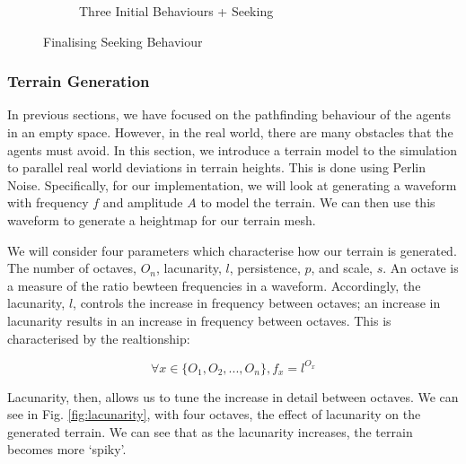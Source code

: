 \documentclass[12pt]{article}
\begin{document}
\begin{figure}[H]
\begin{subfigure}{.45\textwidth}
\caption{Three Initial Behaviours + Seeking}
\label{fig:exp7}
\end{subfigure}
\caption{Finalising Seeking Behaviour}
\label{fig:exp67}
\end{figure}

\subsubsection{Terrain Generation}
In previous sections, we have focused on the pathfinding behaviour of the agents in an empty space. However, in the real world, there are many obstacles that the agents must avoid. In this section, we introduce a terrain model to the simulation to parallel real world deviations in terrain heights. This is done using Perlin Noise\cite[289-293]{Perlin}. Specifically, for our implementation, we will look at generating a waveform with frequency $f$ and amplitude $A$ to model the terrain. We can then use this waveform to generate a heightmap for our terrain mesh.

We will consider four parameters which characterise how our terrain is generated. The number of octaves, $O_n$, lacunarity, $l$, persistence, $p$, and scale, $s$.
An octave is a measure of the ratio bewteen frequencies in a waveform. Accordingly, the lacunarity, $l$, controls the increase in frequency between octaves; an increase in lacunarity results in an increase in frequency between octaves. This is characterised by the realtionship:

$$\forall x \in \{O_1,O_2,...,O_n\}, f_x = l^{O_x}$$

Lacunarity, then, allows us to tune the increase in detail between octaves. We can see in Fig. \ref{fig:lacunarity}, with four octaves, the effect of lacunarity on the generated terrain. We can see that as the lacunarity increases, the terrain becomes more `spiky'.
\end{document}
